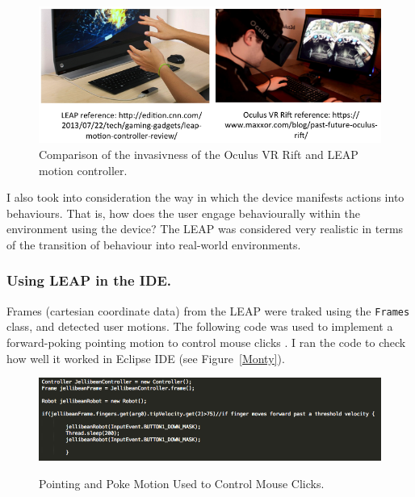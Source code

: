 \documentclass[a4paper, 11pt]{article}
\begin{document}
\begin{figure}[H]
\begin{center}
\includegraphics[scale=0.5]{VRvsLEAP}
\caption{Comparison of the invasivness of the Oculus VR Rift and LEAP motion controller.}
\label{vrVsLEAP}
\end{center}
\end{figure}

I also took into consideration the way in which the device manifests actions into behaviours. That is, how does the user engage behaviourally within the environment using the device? The LEAP was considered very realistic in terms of the transition of behaviour into real-world environments.

\subsubsection{Using LEAP in the IDE.}
Frames (cartesian coordinate data) from the LEAP were traked using the \texttt{Frames} class, and detected user motions. The following code was used to implement a forward-poking pointing motion to control mouse clicks \cite{leapide}. I ran the code to check how well it worked in Eclipse IDE (see Figure~\ref{Monty}). 

\begin{figure}[H]
\begin{center}
\includegraphics[scale=0.5]{leapCode}\\
\caption{Pointing and Poke Motion Used to Control Mouse Clicks.}
\label{leapCode}
\end{center}
\end{figure}
\end{document}
